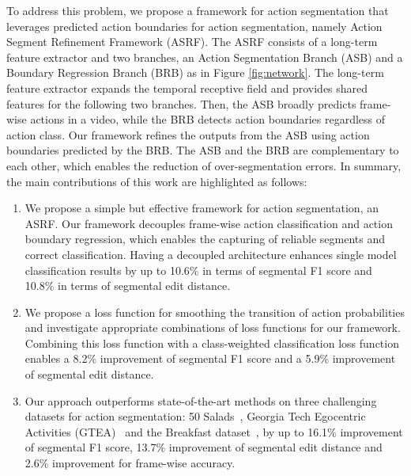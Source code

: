 \documentclass[10pt,twocolumn,letterpaper]{article}
\begin{document}
To address this problem, we propose a framework for action segmentation that leverages predicted action boundaries for action segmentation, namely Action Segment Refinement Framework (ASRF).
The ASRF consists of a long-term feature extractor and two branches, an Action Segmentation Branch (ASB) and a Boundary Regression Branch (BRB) as in Figure \ref{fig:network}.
The long-term feature extractor expands the temporal receptive field and provides shared features for the following two branches. 
Then, the ASB broadly predicts frame-wise actions in a video, while the BRB detects action boundaries regardless of action class.
Our framework refines the outputs from the ASB using action boundaries predicted by the BRB.
The ASB and the BRB are complementary to each other, which enables the reduction of over-segmentation errors. In summary, the main contributions of this work are highlighted as follows:

\begin{enumerate}
\setlength{\itemsep}{0cm}
\setlength{\parskip}{0cm} \item We propose a simple but effective framework for action segmentation, an ASRF. Our framework decouples frame-wise action classification and action boundary regression, which enables the capturing of reliable segments and correct classification. Having a decoupled architecture enhances single model classification results by up to 10.6\% in terms of segmental F1 score and 10.8\% in terms of segmental edit distance. 
\item We propose a loss function for smoothing the transition of action probabilities and investigate appropriate combinations of loss functions for our framework. Combining this loss function with a class-weighted classification loss function enables a 8.2\% improvement of segmental F1 score and a 5.9\% improvement of segmental edit distance.
\item Our approach outperforms state-of-the-art methods on three challenging datasets for action segmentation: 50 Salads~\cite{50salads}, Georgia Tech Egocentric Activities (GTEA)~\cite{gtea} and the Breakfast dataset~\cite{breakfast}, by up to 16.1\% improvement of segmental F1 score, 13.7\% improvement of segmental edit distance and 2.6\% improvement for frame-wise accuracy.
\end{enumerate}
\end{document}
